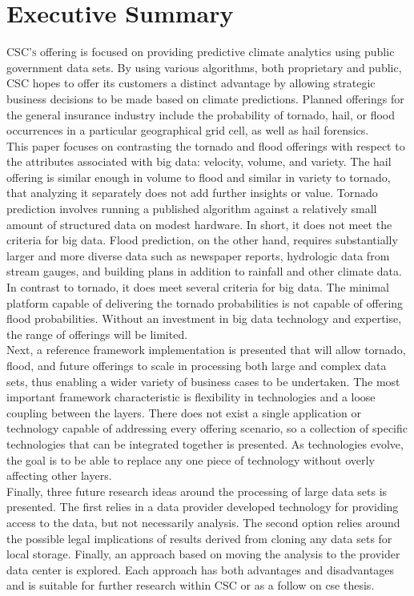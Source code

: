 \section{Executive Summary}
\textsc{CSC's} \climatedge offering is focused on providing predictive climate analytics using public government data sets. By using various algorithms, both proprietary and public, \textsc{CSC} hopes to offer its customers a distinct advantage by allowing strategic business decisions to be made based on climate predictions. Planned offerings for the general insurance industry include the probability of tornado, hail, or flood occurrences in a particular geographical grid cell, as well as hail forensics. \\

This paper focuses on contrasting the tornado and flood offerings with respect to the attributes associated with big data: velocity, volume, and variety. The hail offering is similar enough in volume to flood and similar in variety to tornado, that analyzing it separately does not add further insights or value. Tornado prediction involves running a published algorithm against a relatively small amount of structured data on modest hardware. In short, it does not meet the criteria for big data. Flood prediction, on the other hand, requires substantially larger and more diverse data such as newspaper reports, hydrologic data from stream gauges, and building plans in addition to rainfall and other climate data.  In contrast to tornado, it does meet several criteria for big data. The minimal platform capable of delivering the tornado probabilities is not capable of offering flood probabilities. Without an investment in big data technology and expertise, the range of \climatedge offerings will be limited.\\

Next, a reference framework implementation is presented that will allow tornado, flood, and future \climatedge offerings to scale in processing both large and complex data sets, thus enabling a wider variety of business cases to be undertaken. The most important framework characteristic is flexibility in technologies and a loose coupling between the layers. There does not exist a single application or technology capable of addressing every offering scenario, so a collection of specific technologies that can be integrated together is presented. As technologies evolve, the goal is to be able to replace any one piece of technology without overly affecting other layers.\\

Finally, three future research ideas around the processing of large data sets is presented. The first relies in a data provider developed technology for providing access to the data, but not necessarily analysis.  The second option relies around the possible legal implications of results derived from cloning any data sets for local storage. Finally, an approach based on moving the analysis to the provider data center is explored. Each approach has both advantages and disadvantages and is suitable for further research within \textsc{CSC} or as a follow on \gls{cse} thesis.